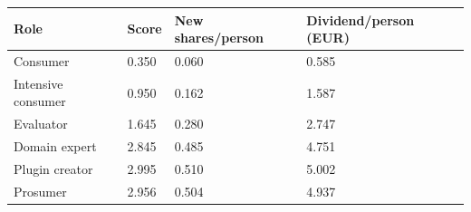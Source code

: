 \begin{tabular}{llll}
\toprule
Role & Score & New shares/person & Dividend/person (EUR) \\
\midrule
Consumer & 0.350 & 0.060 & 0.585 \\
Intensive consumer & 0.950 & 0.162 & 1.587 \\
Evaluator & 1.645 & 0.280 & 2.747 \\
Domain expert & 2.845 & 0.485 & 4.751 \\
Plugin creator & 2.995 & 0.510 & 5.002 \\
Prosumer & 2.956 & 0.504 & 4.937 \\
\bottomrule
\end{tabular}
